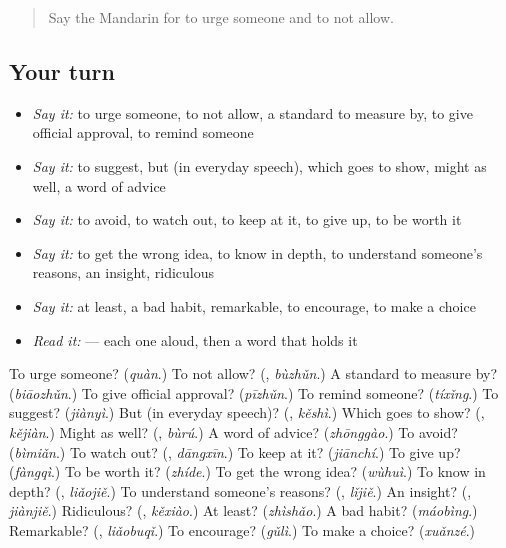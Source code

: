 \label{lesson:ZH-R368-review-364-368}



\begin{quote}
Say the Mandarin for to urge someone and to not allow.
\end{quote}

\subsection*{Your turn}
\begin{itemize}
\raggedright
  \item \emph{Say it:} to urge someone, to not allow, a standard to measure by, to give official approval, to remind someone
  \item \emph{Say it:} to suggest, but (in everyday speech), which goes to show, might as well, a word of advice
  \item \emph{Say it:} to avoid, to watch out, to keep at it, to give up, to be worth it
  \item \emph{Say it:} to get the wrong idea, to know in depth, to understand someone's reasons, an insight, ridiculous
  \item \emph{Say it:} at least, a bad habit, remarkable, to encourage, to make a choice
  \item \emph{Read it:}    — each one aloud, then a word that holds it
\end{itemize}

\begin{tcolorbox}[breakable,colback=teal!4,colframe=teal!35!black,title={Before you move on}]
To urge someone? (\emph{quàn}.) To not allow? (\textbf{}, \emph{bùzhǔn}.) A standard to measure by? (\emph{biāozhǔn}.) To give official approval? (\emph{pīzhǔn}.) To remind someone? (\emph{tíxǐng}.) To suggest? (\emph{jiànyì}.) But (in everyday speech)? (\textbf{}, \emph{kěshì}.) Which goes to show? (\textbf{}, \emph{kějiàn}.) Might as well? (\textbf{}, \emph{bùrú}.) A word of advice? (\emph{zhōnggào}.) To avoid? (\emph{bìmiǎn}.) To watch out? (\textbf{}, \emph{dāngxīn}.) To keep at it? (\emph{jiānchí}.) To give up? (\emph{fàngqì}.) To be worth it? (\emph{zhíde}.) To get the wrong idea? (\emph{wùhuì}.) To know in depth? (\textbf{}, \emph{liǎojiě}.) To understand someone's reasons? (\textbf{}, \emph{lǐjiě}.) An insight? (\textbf{}, \emph{jiànjiě}.) Ridiculous? (\textbf{}, \emph{kěxiào}.) At least? (\emph{zhìshǎo}.) A bad habit? (\emph{máobìng}.) Remarkable? (\textbf{}, \emph{liǎobuqǐ}.) To encourage? (\emph{gǔlì}.) To make a choice? (\emph{xuǎnzé}.)
\end{tcolorbox}
